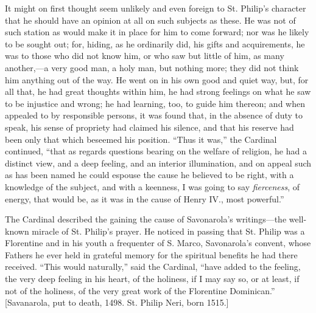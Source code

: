 It might on first thought seem unlikely and even foreign to St.
Philip’s character that he should have an opinion at all on such
subjects as these. He was not of such station as would make it in
place for him to come forward; nor was he likely to be sought out;
for, hiding, as he ordinarily did, his gifts and acquirements, he was
to those who did not know him, or who saw but little of him, as many
another,—a very good man, a holy man, but nothing more; they did not
think him anything out of the way. He went on in his own good and
quiet way, but, for all that, he had great thoughts within him, he had
strong feelings on what he saw to be injustice and wrong; he had
learning, too, to guide him thereon; and when appealed to by
responsible persons, it was found that, in the absence of duty to
speak, his sense of propriety had claimed his silence, and that his
reserve had been only that which beseemed his position. ``Thus it
was,'' the Cardinal continued, ``that as regards questions
bearing on the welfare of religion, he had a distinct view, and a deep
feeling, and an interior illumination, and on appeal such as has been
named he could espouse the cause he believed to be right, with a
knowledge of the subject, and with a keenness, I was going to say \emph{fierceness},
of energy, that would be, as it was in the cause of Henry IV., most
powerful.''

The Cardinal described the gaining the cause of Savonarola’s
writings—the well-known miracle of St. Philip’s prayer. He noticed
in passing that St. Philip was a Florentine and in his youth a
frequenter of S. Marco, Savonarola’s convent, whose Fathers he ever
held in grateful memory for the spiritual benefits he had there
received. ``This would
naturally,'' said the Cardinal, ``have added to the feeling,
the very deep feeling in his heart, of the holiness, if I may say so,
or at least, if not of the holiness, of the very great work of the
Florentine Dominican.'' [Savanarola, put to death, 1498. St.
Philip Neri, born 1515.]

